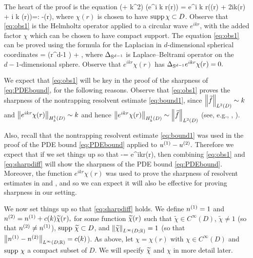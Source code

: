 The heart of the proof is the equation
\beq\label{eq:obs1}
(\Delta + k^2) \big(e^{i k r}\chi(r)\big) =  e^{i k r}\mleft(\Delta \chi(r) + 2ik(r) + i k  \chi(r)\mright)=: -(r),
\eeq
where $\chi(r)$ is chosen to have $\operatorname{supp} \chi \subset D$. Observe that \cref{eq:obs1} is the Helmholtz operator applied to a circular wave $e^{ikr}$, with the added factor $\chi$ which can be chosen to have compact support. The equation \cref{eq:obs1} can be proved using the formula for the Laplacian in $d$-dimensional spherical coordinates
\beqs
\Delta \chi =  \mleft(r^{d-1}  \mright) +  \LapBel \chi,
\eeqs
where $\Delta_{\mathrm{S}^{d-1}}$ is Laplace--Beltrami operator on the $d-1$-dimensional sphere. Observe that $e^{ikr} \chi(r)$ has $\Delta_{\mathrm{S}^{d-1}} e^{ikr} \chi(r) = 0.$

We expect that \cref{eq:obs1} will be key in the proof of the sharpness of \cref{eq:PDEbound}, for the following reasons. Observe that \cref{eq:obs1} proves the sharpness of the nontrapping resolvent estimate \cref{eq:bound1}, since $\NLtD{\ftilde}\sim k$ and $\NHokD{e^{ikr}\chi(r)}\sim k$  and hence $\NHokD{e^{ikr}\chi(r)} \sim \NLtD{\ftilde}$ (see, e.g., \cite[Lemma 3.10]{ChMo:08},  \cite[Lemma 4.12]{Sp:14}).

Also, recall that  the nontrapping resolvent estimate \cref{eq:bound1} was used in the proof of the PDE bound \cref{eq:PDEbound} applied to ${u}^{(1)}-{u}^{(2)}.$ Therefore we expect that if we set things up so that
\beq\label{eq:sharpdiff}
\uso-\ust = e^{ikr}\chi(r),
\eeq
then  combining \cref{eq:obs1} and \cref{eq:sharpdiff} will show the sharpness of the PDE bound \cref{eq:PDEbound}. Moreover, the function $e^{ikr} \chi(r)$ was used to prove the sharpness of resolvent estimates in \cite[Discussion on p. 1445 and Lemma 3.10]{ChMo:08} and \cite[Lemma 4.12]{Sp:14}, and so we can expect it will also be effective for proving sharpness in our setting.

We now set things up so that \cref{eq:sharpdiff} holds. We define ${n}^{(1)} = 1$ and ${n}^{(2)} = {n}^{(1)} + c(k) \widetilde{\chi}(r),$ for some function $\widetilde{\chi}(r)$ such that $\widetilde{\chi}\in C^{\infty}(D)$, $\widetilde{\chi}\not = 1$ (so that ${n}^{(2)}\not = {n}^{(1)}$), $\operatorname{supp} \, \widetilde{\chi} \subset D$, and $\NLiDRR{\chitilde} = 1$ (so that $\NLiDRR{\nso-\nst} = c(k)$).   As above, let $\chi=\chi(r)$ with $\chi \in C^{\infty}(D)$ and $\operatorname{supp} \,\chi$ a compact subset of $D$. We will specify $\widetilde{\chi}$ and $\chi$ in more detail later.

